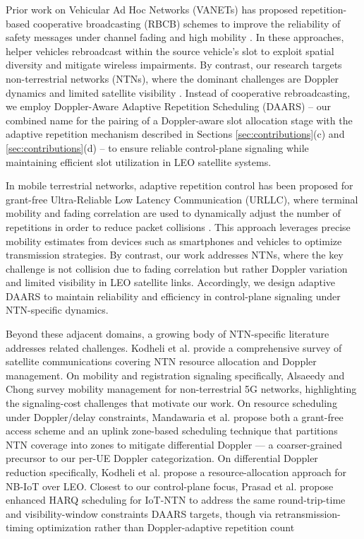 \documentclass[conference]{IEEEtran}
\begin{document}
Prior work on Vehicular Ad Hoc Networks (VANETs) has proposed repetition-based cooperative broadcasting (RBCB) schemes to improve the reliability of safety messages under channel fading and high mobility \cite{Ref21}. In these approaches, helper vehicles rebroadcast within the source vehicle's slot to exploit spatial diversity and mitigate wireless impairments. By contrast, our research targets non-terrestrial networks (NTNs), where the dominant challenges are Doppler dynamics and limited satellite visibility \cite{Ref21}. Instead of cooperative rebroadcasting, we employ Doppler-Aware Adaptive Repetition Scheduling (DAARS) -- our combined name for the pairing of a Doppler-aware slot allocation stage with the adaptive repetition mechanism described in Sections \ref{sec:contributions}(c) and \ref{sec:contributions}(d) -- to ensure reliable control-plane signaling while maintaining efficient slot utilization in LEO satellite systems.

In mobile terrestrial networks, adaptive repetition control has been proposed for grant-free Ultra-Reliable Low Latency Communication (URLLC), where terminal mobility and fading correlation are used to dynamically adjust the number of repetitions in order to reduce packet collisions \cite{Ref22}. This approach leverages precise mobility estimates from devices such as smartphones and vehicles to optimize transmission strategies\cite{Ref23,Ref24,Ref25}. By contrast, our work addresses NTNs, where the key challenge is not collision due to fading correlation but rather Doppler variation and limited visibility in LEO satellite links. Accordingly, we design adaptive DAARS to maintain reliability and efficiency in control-plane signaling under NTN-specific dynamics.

Beyond these adjacent domains, a growing body of NTN-specific literature addresses related challenges. Kodheli et al. \cite{kodheli2021} provide a comprehensive survey of satellite communications covering NTN resource allocation and Doppler management. On mobility and registration signaling specifically, Alsaeedy and Chong \cite{alsaeedy2024} survey mobility management for non-terrestrial 5G networks, highlighting the signaling-cost challenges that motivate our work. On resource scheduling under Doppler/delay constraints, Mandawaria et al. propose both a grant-free access scheme \cite{mandawaria2022a} and an uplink zone-based scheduling technique \cite{mandawaria2022b} that partitions NTN coverage into zones to mitigate differential Doppler — a coarser-grained precursor to our per-UE Doppler categorization. On differential Doppler reduction specifically, Kodheli et al. \cite{kodheli2018} propose a resource-allocation approach for NB-IoT over LEO. Closest to our control-plane focus, Prasad et al. \cite{prasad2023} propose enhanced HARQ scheduling for IoT-NTN to address the same round-trip-time and visibility-window constraints DAARS targets, though via retransmission-timing optimization rather than Doppler-adaptive repetition count
\end{document}
